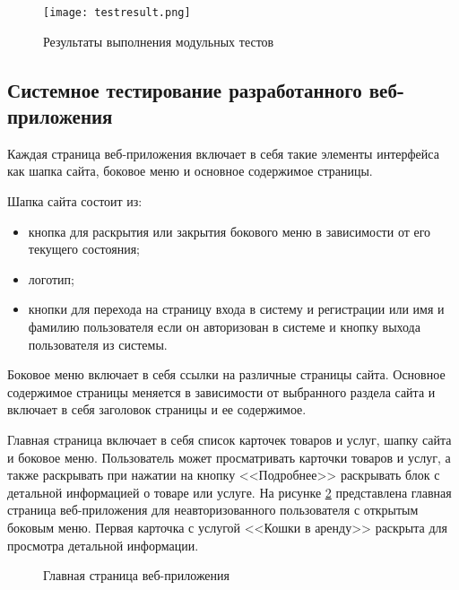 \newpage %
\begin{figure}[H] %
\centering
\texttt{[image: testresult.png]}
\caption{Результаты выполнения модульных тестов}
\label{testresult:image}
\end{figure}

\subsection{Системное тестирование разработанного веб-приложения}

Каждая страница веб-приложения включает в себя такие элементы интерфейса как шапка сайта, боковое меню и основное содержимое страницы.

Шапка сайта состоит из:
\begin{itemize}
    \item кнопка для раскрытия или закрытия бокового меню в зависимости от его текущего состояния;
    \item логотип;
    \item кнопки для перехода на страницу входа в систему и регистрации или имя и фамилию пользователя если он авторизован в системе и кнопку выхода пользователя из системы.
\end{itemize}

Боковое меню включает в себя ссылки на различные страницы сайта.
Основное содержимое страницы меняется в зависимости от выбранного раздела сайта и включает в себя заголовок страницы и ее содержимое. 

Главная страница включает в себя список карточек товаров и услуг, шапку сайта и боковое меню. Пользователь может просматривать карточки товаров и услуг, а также раскрывать при нажатии на кнопку <<Подробнее>> раскрывать блок с детальной информацией о товаре или услуге.
На рисунке \ref{test-front1:image} представлена главная страница веб-приложения для неавторизованного пользователя с открытым боковым меню. Первая карточка с услугой <<Кошки в аренду>> раскрыта для просмотра детальной информации.


\newpage %
\begin{figure}[H] %
\caption{Главная страница веб-приложения}
\label{test-front1:image}
\end{figure}

